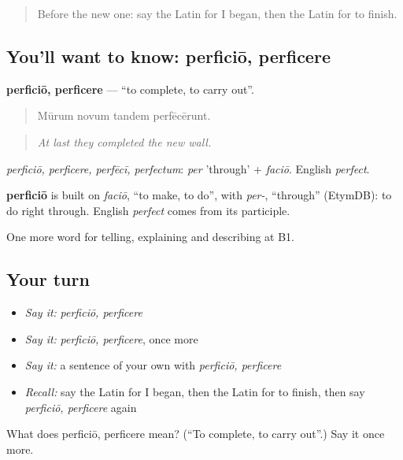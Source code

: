 \begin{quote}
Before the new one: say the Latin for I began, then the Latin for to finish.
\end{quote}

\subsection*{You'll want to know: perficiō, perficere}
\textbf{perficiō, perficere} — \textquotedblleft{}to complete, to carry out\textquotedblright{}.

\begin{quote}
Mūrum novum tandem perfēcērunt.
\end{quote}

\begin{quote}
\emph{At last they completed the new wall.}
\end{quote}

\emph{perficiō, perficere, perfēcī, perfectum}: \emph{per} 'through' + \emph{faciō}. English \emph{perfect}.

\begin{cousinweb}
\textbf{perficiō} is built on \emph{faciō}, \textquotedblleft{}to make, to do\textquotedblright{}, with \emph{per-}, \textquotedblleft{}through\textquotedblright{} (EtymDB): to do right through. English \emph{perfect} comes from its participle.
\end{cousinweb}

\begin{grammarlens}[title={What you've built}]
One more word for telling, explaining and describing at B1.
\end{grammarlens}

\subsection*{Your turn}
\begin{itemize}
\raggedright
  \item \emph{Say it:} \emph{perficiō, perficere}
  \item \emph{Say it:} \emph{perficiō, perficere}, once more
  \item \emph{Say it:} a sentence of your own with \emph{perficiō, perficere}
  \item \emph{Recall:} say the Latin for I began, then the Latin for to finish, then say \emph{perficiō, perficere} again
\end{itemize}

\begin{tcolorbox}[breakable,colback=teal!4,colframe=teal!35!black,title={Before you move on}]
What does perficiō, perficere mean? (\textquotedblleft{}To complete, to carry out\textquotedblright{}.) Say it once more.
\end{tcolorbox}

